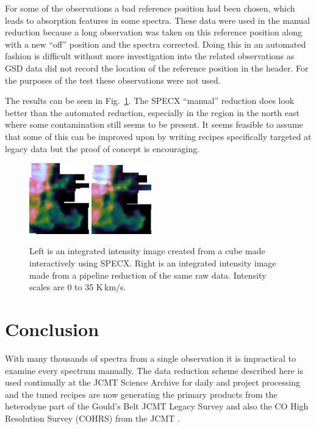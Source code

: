 \documentclass[final,authoryear,5p,times,twocolumn]{elsarticle}
\begin{document}
For some of the observations a bad reference position had been chosen,
which leads to absorption features in some spectra. These data were
used in the manual reduction because a long observation was taken on
this reference position along with a new ``off'' position and the
spectra corrected. Doing this in an automated fashion is difficult
without more investigation into the related observations as GSD data
did not record the location of the reference position in the
header. For the purposes of the test these observations were not used.

The results can be seen in Fig.\ \ref{fig:hhcmp}. The SPECX ``manual''
reduction does look better than the automated reduction, especially in
the region in the north east where some contamination still seems to
be present. It seems feasible to assume that some of this can be
improved upon by writing recipes specifically targeted at legacy data
but the proof of concept is encouraging.

\begin{figure}
\includegraphics[width=0.23\textwidth]{horsehead-specx}
\includegraphics[width=0.23\textwidth]{horsehead-pipeline}
\caption{Left is an integrated intensity image created from
  a cube made interactively using SPECX. Right is an
  integrated intensity image made from a pipeline reduction of the
  same raw data. Intensity scales are 0 to 35 K\,km/s.}
\label{fig:hhcmp}
\end{figure}

\section{Conclusion}

With many thousands of spectra from a single observation it is
impractical to examine every spectrum manually. The data reduction
scheme described here is used continually at the JCMT Science Archive
\citep{2011ASPC..442..203E} for daily and project processing and the
tuned recipes are now generating the primary products from the
heterodyne part of the Gould's Belt JCMT Legacy Survey
\citep{2007PASP..119..855W} and also the CO High Resolution Survey
(COHRS) from the JCMT \citep{COHRS2014}.
\end{document}
